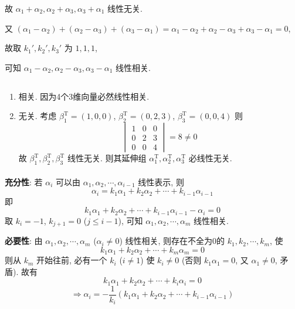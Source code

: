 		 故 \( \alpha_{1} + \alpha_{2}, \alpha_{2} + \alpha_{3}, \alpha_{3} + \alpha_{1} \) 线性无关.

		 又 \( (\alpha_{1} - \alpha_{2}) + (\alpha_{2} - \alpha_{3}) + (\alpha_{3} - \alpha_{1}) = \alpha_{1} - \alpha_{2} + \alpha_{2} - \alpha_{3} + \alpha_{3} - \alpha_{1} = 0 \),

		 故取 \( k_{1}', k_{2}', k_{3}' \) 为 \( 1,1,1 \),

		 可知 \( \alpha_{1} - \alpha_{2}, \alpha_{2} - \alpha_{3}, \alpha_{3} - \alpha_{1} \) 线性相关.


 \subsection{} %

	 \paragraph{} %
		 \begin{enumerate}
			 \item %
			       相关. 因为4个3维向量必然线性相关.
			 \item %
			       无关. 考虑 \( \beta_{1}^{\mathrm{T}} = (1, 0, 0) \), \( \beta_{2}^{\mathrm{T}} = (0, 2, 3) \), \( \beta_{3}^{\mathrm{T}} = (0, 0, 4) \) 则
			       \[ \begin{vmatrix} 1 & 0 & 0 \\
                0 & 2 & 3 \\
                0 & 0 & 4\end{vmatrix} = 8 \neq 0 \]
			       故 \( \beta_{1}^{\mathrm{T}}, \beta_{2}^{\mathrm{T}}, \beta_{3}^{\mathrm{T}} \) 线性无关. 则其延伸组 \( \alpha_{1}^{\mathrm{T}}, \alpha_{2}^{\mathrm{T}}, \alpha_{3}^{\mathrm{T}} \) 必线性无关.
		 \end{enumerate}

	 \paragraph{} %
		 {\bf 充分性}: 若 \( \alpha_{i} \) 可以由 \( \alpha_{1}, \alpha_{2}, \cdots, \alpha_{i-1} \) 线性表示, 则
		 \[ \alpha_{i} = k_{1}\alpha_{1} + k_{2}\alpha_{2} + \cdots + k_{i-1}\alpha_{i-1} \]
		 即 \[ k_{1}\alpha_{1} + k_{2}\alpha_{2} + \cdots + k_{i-1}\alpha_{i-1} - \alpha_{i} = 0 \]
		 取 \( k_{i} = -1 \), \( k_{j+1} = 0 \) (\( j \leq i-1 \)), 可知 \( \alpha_{1}, \alpha_{2}, \cdots, \alpha_{m} \) 线性相关.

		 {\bf 必要性}: 由 \( \alpha_{1}, \alpha_{2}, \cdots, \alpha_{m} \) (\( \alpha_{i} \neq 0 \)) 线性相关, 则存在不全为0的 \( k_{1}, k_{2}, \cdots, k_{m} \), 使
		 \[ k_{1}\alpha_{1} + k_{2}\alpha_{2} + \cdots + k_{m}\alpha_{m} = 0 \]
		 则从 \( k_{m} \) 开始往前, 必有一个 \( k_{i} \) (\( i \neq 1 \)) 使 \( k_{i} \neq 0 \) (否则 \( k_{1}\alpha_{1} = 0 \), 又 \( \alpha_{1} \neq 0 \), 矛盾). 故有
		 \[ k_{1}\alpha_{1} + k_{2}\alpha_{2} + \cdots + k_{i}\alpha_{i} = 0 \]
		 \[ \Rightarrow \alpha_{i} = -\frac{1}{k_{i}}(k_{1}\alpha_{1} + k_{2}\alpha_{2} + \cdots + k_{i-1}\alpha_{i-1}) \]


